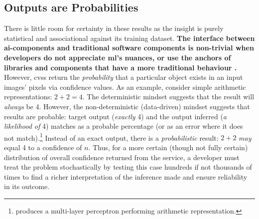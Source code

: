 \subsection{Outputs are Probabilities}
There is little room for certainty in these results as the insight is purely statistical and associational \citep{Pearl:2018uv} against its training dataset. \textbf{The interface between \gls{ai}-components and traditional software components is non-trivial when developers do not appreciate \gls{ml}'s nuances, or use the anchors of libraries and components that have a more traditional behaviour \citep{8506423,tversky1974judgment,vasa2010growth,kahneman2011thinking}.}
However, \glspl{cvs} return the \textit{probability} that a particular object exists in an input images' pixels via confidence values.
As an example, consider simple arithmetic representations: \mbox{$2+2=4$}. The deterministic mindset suggests that the result will \textit{always} be 4. However, the non-deterministic (data-driven) mindset suggests that results are probable: target output (\textit{exactly} 4) and the output inferred (\textit{a likelihood of} 4) matches as a probable percentage (or as an error where it does not match).\footnote{\citet{Blake:1998vd} produces a multi-layer perceptron  performing arithmetic representation.} Instead of an exact output, there is a \textit{probabilistic} result: $2+2$ \textit{may} equal 4 to a confidence of $n$. 
Thus, for a more certain (though not fully certain) distribution of overall confidence returned from the service, a developer must treat the problem stochastically by testing this case hundreds if not thousands of times to find a richer interpretation of the inference made and ensure reliability in its outcome.

